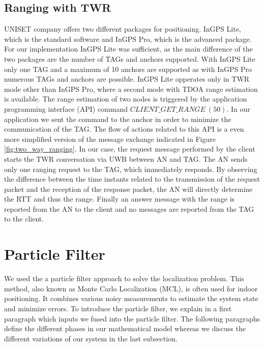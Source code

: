 \subsection{Ranging with TWR}
UNISET company offers two different packages for positioning. InGPS Lite, which is the standard software and InGPS Pro, which is the advanced package. For our implementation InGPS Lite was sufficient, as the main difference of the two packages are the number of TAGs and anchors supported. With InGPS Lite only one TAG and a maximum of 10 anchors are supported as with InGPS Pro numerous TAGs and anchors are possible. InGPS Lite opperates only in TWR mode other than InGPS Pro, where a second mode with TDOA range estimation is available.
The range estimation of two nodes is triggered by the application programming interface (API) command $CLIENT\_GET\_RANGE\ (50)$. In our application we sent the command to the anchor in order to minimize the communication of the TAG. The flow of actions related to this API is a even more simplified version of the message exchange indicated in Figure \ref{fig:two_way_ranging}. In our case, the request message performed by the client starts the TWR conversation via UWB between AN and TAG. The AN sends only one ranging request to the TAG, which immediately responds. By observing the difference between the time instants related to the transmission of the request packet and the reception of the response packet, the AN will directly determine the RTT and thus the range. Finally an answer message with the range is reported from the AN to the client and no messages are reported from the TAG to the client.


\section{Particle Filter}
We used the a particle filter approach to solve the localization problem. This method, also known as Monte Carlo Localization (MCL), is often used for indoor positioning. It combines various noisy measurements to estimate the system state and minimize errors. To introduce the particle filter, we explain in a first paragraph which inputs we fused into the particle filter. The following paragraphs define the different phases in our mathematical model whereas we discuss the different variations of our system in the last subsection.

